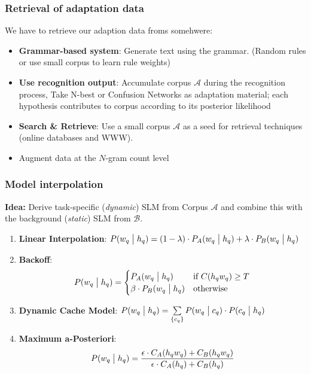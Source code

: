 \subsubsection{Retrieval of adaptation data}
We have to retrieve our adaption data froms somehwere:
\begin{itemize}
    \item \textbf{Grammar-based system}: Generate text using the grammar. (Random rules or use small corpus to learn rule weights)
    \item \textbf{Use recognition output}: Accumulate corpus $\mathcal{A}$ during the recognition process, Take N-best or Confusion Networks as adaptation material;
each hypothesis contributes to corpus according to its posterior likelihood
    \item \textbf{Search \& Retrieve}: Use a small corpus $\mathcal{A}$ as a seed for retrieval techniques (online databases and WWW).
\item Augment data at the $N$-gram count level
\end{itemize}

\subsubsection{Model interpolation}
\textbf{Idea:} Derive task-specific (\emph{dynamic}) SLM from Corpus $\mathcal{A}$ and combine this with the background (\emph{static}) SLM from $\mathcal{B}$.
\begin{enumerate}
    \item \textbf{Linear Interpolation}: $P(w_q \bigm| h_q) = (1 - \lambda) \cdot P_A(w_q \bigm| h_q) + \lambda \cdot P_B(w_q \bigm| h_q)$
    \item \textbf{Backoff}:
        \[
            P(w_q \bigm| h_q) = \begin{cases}
                P_A(w_q \bigm| h_q) & \mbox{if } C(h_q w_q) \geq T \\
                \beta \cdot P_B(w_q \bigm| h_q) & \mbox{otherwise}
            \end{cases}
        \]
    \item \textbf{Dynamic Cache Model}: $P(w_q \bigm| h_q) = \sum\limits_{\left\{c_q\right\}} P(w_q \bigm| c_q) \cdot P(c_q \bigm| h_q)$
    \item \textbf{Maximum a-Posteriori}:
        \[
            P(w_q \bigm| h_q) = \frac{\epsilon \cdot C_A(h_qw_q) + C_B(h_qw_q)}{\epsilon \cdot C_A(h_q) + C_B(h_q)}
        \]
\end{enumerate}

